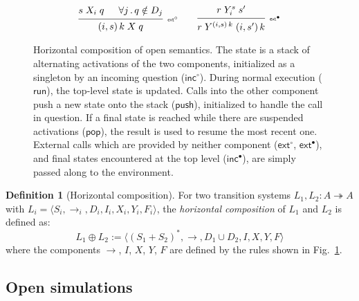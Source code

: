 \documentclass[draft,11pt]{report}
\theoremstyle{definition}
\newtheorem{definition}[theorem]{Definition}
\newcommand{\kw}[1]{\ensuremath{ \mathsf{#1} }}
\newcommand{\que}{\circ}         %
\newcommand{\ans}{\bullet}       %
\begin{document}
\begin{figure}
\begin{minipage}{0.66\textwidth}
\[\begin{array}{c}
      \\[1ex]
     {\begin{prooftree}
        \hypo{s \mathrel{X_i} q}
        \hypo{\forall j \,.\, q \notin D_j}
        \infer2[\tiny $\kw{ext}^\que$]{(i, s) \, k \mathrel{X} q}
      \end{prooftree}}
      \qquad
     {\begin{prooftree}
        \hypo{r \mathrel{Y_i^s} s'}
        \infer1[\tiny $\kw{ext}^\ans$]{
          r \mathrel{Y^{(i, s) \, k}} (i, s') \, k}
      \end{prooftree}}
    \end{array}
  \]
  \end{minipage}
    \caption{Horizontal composition of open semantics.
      The state is a stack of alternating activations
      of the two components,
      initialized as a singleton by an incoming question ($\kw{inc}^\que$).
      During normal execution ($\kw{run}$),
      the top-level state is updated.
      Calls into the other component
      push a new state onto the stack ($\kw{push}$),
      initialized to handle the call in question.
      If a final state is reached
      while there are suspended activations ($\kw{pop}$),
      the result is used to resume the most recent one.
      External calls which are provided by neither component
      ($\kw{ext}^\que$, $\kw{ext}^\ans$),
      and final states encountered at the top level
      ($\kw{inc}^\ans$),
      are simply passed along to the environment.
    }
    \label{fig:hcomp}
\end{figure}

\begin{definition}[Horizontal composition] \label{def:hcomp} %
For two transition systems $L_1, L_2 : A \twoheadrightarrow A$
with
$L_i = \langle S_i, {\rightarrow}_i, D_i, I_i, X_i, Y_i, F_i \rangle$,
the \emph{horizontal composition} of $L_1$ and $L_2$
is defined as:
\[
    L_1 \oplus L_2 :=
    \langle
      (S_1 + S_2)^*, {\rightarrow}, D_1 \cup D_2, I, X, Y, F
    \rangle
\]
where the components $\rightarrow$, $I$, $X$, $Y$, $F$
are defined by
the rules shown in Fig.~\ref{fig:hcomp}.
\end{definition}



\subsection{Open simulations} \label{sec:sem:ref} %
\end{document}
